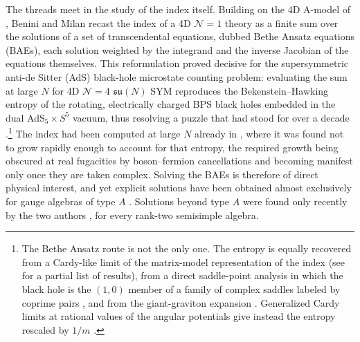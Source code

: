 \documentclass[aps, prx, nofootinbib, twocolumn,amsfonts,amsmath,amssymb,mathtools,superscriptaddress,preprintnumbers,floatfix,reprint]{revtex4-2}
\begin{document}
The threads meet in the study of the index itself. Building on the 4D A-model of
\cite{Closset:2017bse}, Benini and Milan \cite{Benini:2018mlo} recast the index
of a 4D $\mathcal{N}=1$ theory as a finite sum over the solutions of a set of
transcendental equations, dubbed Bethe Ansatz equations (BAEs), each solution
weighted by the integrand and the inverse Jacobian of the equations themselves.
This reformulation proved decisive for the supersymmetric anti-de Sitter (AdS)
black-hole microstate counting problem: evaluating the sum at large $N$ for 4D
$\mathcal{N}=4$ $\mathfrak{su}(N)$ SYM reproduces the Bekenstein--Hawking
entropy of the rotating, electrically charged BPS black holes
\cite{Gutowski:2004ez,Gutowski:2004yv,Chong:2005da,Chong:2005hr,Kunduri:2006ek}
embedded in the dual AdS$_5\times S^5$ vacuum, thus resolving a puzzle that had
stood for over a decade \cite{Benini:2018ywd}.\footnote{The Bethe Ansatz route
is not the only one. The entropy is equally recovered from a Cardy-like limit of
the matrix-model representation of the index (see \cite{Choi:2018hmj,Cabo-Bizet:2018ehj,Cabo-Bizet:2019osg,Cabo-Bizet:2020nkr,Honda:2019cio,ArabiArdehali:2019tdm,Cabo-Bizet:2019osg,Kim:2019yrz,Amariti:2020jyx,Amariti:2021ubd,GonzalezLezcano:2020yeb,Amariti:2019mgp,Amariti:2024bsr,Amariti:2023rci,David:2020ems} for a partial list of results),
from a direct saddle-point analysis in which the black hole is the $(1,0)$
member of a family of complex saddles labeled by coprime pairs
\cite{Cabo-Bizet:2019eaf,BenettiGenolini:2023rkq}, and from the giant-graviton expansion
\cite{Imamura:2021ytr,Gaiotto:2021xce,Murthy:2022ien,Beccaria:2023hip,Lee:2022vig,Arai:2019aou,Arai:2019wgv,Arai:2019xmp,Arai:2020uwd,GonzalezLezcano:2026wje,Deddo:2025lfm}.
Generalized Cardy limits at rational values of the angular potentials give
instead the entropy rescaled by $1/m$ \cite{Goldstein:2020yvj,Jejjala:2021hlt}.} The index had been computed at large $N$
already in \cite{Kinney:2005ej}, where it was found not to grow rapidly enough
to account for that entropy, the required growth being obscured at real
fugacities by boson--fermion cancellations and becoming manifest only once they
are taken complex. Solving the BAEs is therefore of direct physical interest,
and yet explicit solutions have been obtained almost exclusively for gauge
algebras of type $A$
\cite{Hong:2018viz,Benini:2021ano,GonzalezLezcano:2019nca,GonzalezLezcano:2021nzk,ArabiArdehali:2019orz,Lanir:2019abx,Amariti:2025vjd,Hosseini:2016cyf}.
Solutions beyond type $A$ were found only recently by the two authors
\cite{B2paper}, for every rank-two semisimple algebra.
\end{document}
